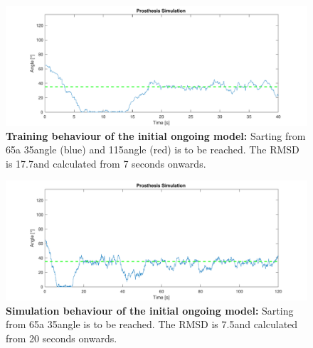  
\begin{figure}[tb]
	\centering
	\includegraphics[width=0.7\linewidth]{figures/OngoingModel/InitialModelTrain-movement(start65-target35)RMSD=17,70511.pdf}
	\caption[Training behaviour of the initial ongoing model]{\textbf{Training behaviour of the initial ongoing model:} Sarting from 65\degree a 35\degree angle (blue) and 115\degree angle (red) is to be reached. The RMSD is 17.7\degree and calculated from 7 seconds onwards. }
	\label{fig:initialmodeltrain}
\end{figure}

\begin{figure}[tb]
	\centering
	\includegraphics[width=0.7\linewidth]{figures/OngoingModel/InitialModelSim-movement(start65-target35)RMSD=7,56571}
	\caption[Simulation behaviour of the initial ongoing model]{\textbf{Simulation behaviour of the initial ongoing model:} Sarting from 65\degree a 35\degree angle is to be reached. The RMSD is 7.5\degree and calculated from 20 seconds onwards. }
	\label{fig:initialmodelsim}
\end{figure}



